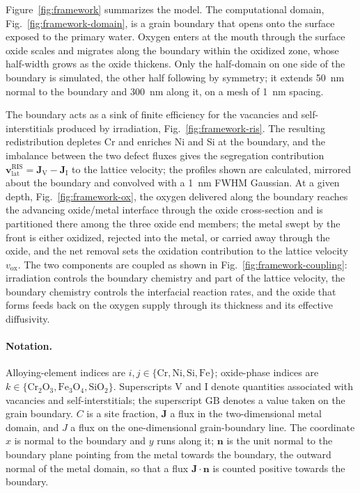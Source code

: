 \documentclass[3p,times,nonatbib]{elsarticle} %
\newcommand{\Vac}{\mathrm{V}}          %
\newcommand{\Int}{\mathrm{I}}          %
\newcommand{\GB}{\mathrm{GB}}
\newcommand{\lat}{\mathrm{lat}}
\newcommand{\ox}{\mathrm{ox}}
\begin{document}
Figure~\ref{fig:framework} summarizes the model. The computational domain,
Fig.~\ref{fig:framework-domain}, is a grain boundary that opens onto the surface exposed to the primary water.
Oxygen enters at the mouth through the surface oxide scales and migrates along the
boundary within the oxidized zone, whose half-width grows as the oxide thickens.
Only the half-domain on one side of the boundary is simulated, the other half
following by symmetry; it extends \SI{50}{nm} normal to the boundary and
\SI{300}{nm} along it, on a mesh of \SI{1}{nm} spacing.

The boundary acts as a sink of finite efficiency for the vacancies and
self-interstitials produced by irradiation, Fig.~\ref{fig:framework-ris}. The resulting
redistribution depletes Cr and enriches Ni and Si at the boundary, and the
imbalance between the two defect fluxes gives the segregation contribution
\(\mathbf{v}_{\lat}^{\mathrm{RIS}}=\mathbf{J}_{\Vac}-\mathbf{J}_{\Int}\) to the
lattice velocity; the profiles shown are calculated, mirrored about the boundary
and convolved with a \SI{1}{\nano\metre} FWHM Gaussian. At a given depth,
Fig.~\ref{fig:framework-ox}, the oxygen delivered along the boundary reaches the
advancing oxide/metal interface through the oxide cross-section and is
partitioned there among the three oxide end members; the metal swept by the front is either
oxidized, rejected into the metal, or carried away through the oxide, and the net
removal sets the oxidation contribution to the lattice velocity \(v_{\ox}\). The two components are coupled as shown in
Fig.~\ref{fig:framework-coupling}: irradiation controls the boundary chemistry and
part of the lattice velocity, the boundary chemistry controls the interfacial
reaction rates, and the oxide that forms feeds back on the oxygen supply through
its thickness and its effective diffusivity.

\paragraph{Notation.}
Alloying-element indices are \(i,j\in\{\mathrm{Cr},\mathrm{Ni},\mathrm{Si},\mathrm{Fe}\}\);
oxide-phase indices are
\(k\in\{\mathrm{Cr_2O_3},\mathrm{Fe_3O_4},\mathrm{SiO_2}\}\).
Superscripts \(\Vac\) and \(\Int\) denote quantities associated with vacancies and
self-interstitials; the superscript \(\GB\) denotes a value taken on the grain
boundary. \(C\) is a site fraction, \(\mathbf{J}\) a flux in the two-dimensional metal
domain, and \(J\) a flux on the one-dimensional grain-boundary line. The coordinate
\(x\) is normal to the boundary and \(y\) runs along it; \(\mathbf{n}\) is the
unit normal to the boundary plane pointing from the metal towards the boundary,
the outward normal of the metal domain, so that a flux \(\mathbf{J}\cdot\mathbf{n}\)
is counted positive towards the boundary.
\end{document}

